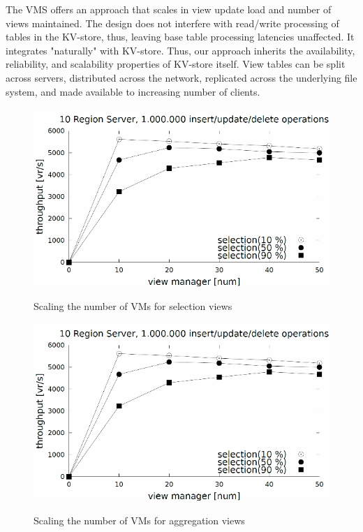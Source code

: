 	
 	The VMS offers an approach that scales in view update load and number 
	of views maintained. The design does not interfere with read/write 
	processing of tables in the KV-store, thus, leaving base table 
	processing latencies unaffected. It integrates "naturally" with 
	KV-store. Thus, our approach inherits the availability, reliability, and 
	scalability properties of KV-store itself. View tables can be split 
	across servers, distributed across the network, replicated across the 
	underlying file system, and made available to increasing number of 
	clients. 


	


    \begin{figure}[h]
    	\centering
    	\includegraphics[width=0.7\linewidth]{figures/Effect_of_scaling_the_number_of_view_managers_for_selection_views}
    	\label{fig:scaling_VMs_selection_views}
    	\caption{Scaling the number of VMs for selection views}
    \end{figure}
    
    \begin{figure}[h]
     	\centering
     	\includegraphics[width=0.7\linewidth]{figures/Effect_of_scaling_the_number_of_view_managers_for_selection_views}
     	\label{fig:scaling_VMs_aggregation_views}
     	\caption{Scaling the number of VMs for aggregation views}
     \end{figure}
     
